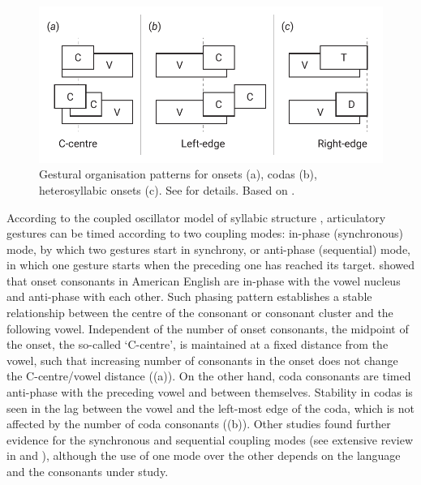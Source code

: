 \documentclass[preprint]{JASAnew}
\begin{document}
\label{s:gestural}

\begin{figure}
  \centering
  \includegraphics{img/gorganisation.pdf}
  \caption{Gestural organisation patterns for onsets (a), codas (b), heterosyllabic onsets (c). See  for details. Based on \citet{marin2010}.}
  \label{f:gorganisation}
\end{figure}

According to the coupled oscillator model of syllabic structure
\citep{browman1988, browman2000, goldstein2006, goldstein2014},
articulatory gestures can be timed according to two coupling modes:
in-phase (synchronous) mode, by which two gestures start in synchrony,
or anti-phase (sequential) mode, in which one gesture starts when the
preceding one has reached its target. \citet{marin2010} showed that
onset consonants in American English are in-phase with the vowel nucleus
and anti-phase with each other. Such phasing pattern establishes a
stable relationship between the centre of the consonant or consonant
cluster and the following vowel. Independent of the number of onset
consonants, the midpoint of the onset, the so-called `C-centre', is
maintained at a fixed distance from the vowel, such that increasing
number of consonants in the onset does not change the C-centre/vowel
distance ((a)). On the other hand, coda consonants
are timed anti-phase with the preceding vowel and between themselves.
Stability in codas is seen in the lag between the vowel and the
left-most edge of the coda, which is not affected by the number of coda
consonants ((b)). Other studies found further
evidence for the synchronous and sequential coupling modes (see
extensive review in \citet{marin2010} and \citet{marin2014}), although
the use of one mode over the other depends on the language and the
consonants under study.
\end{document}
